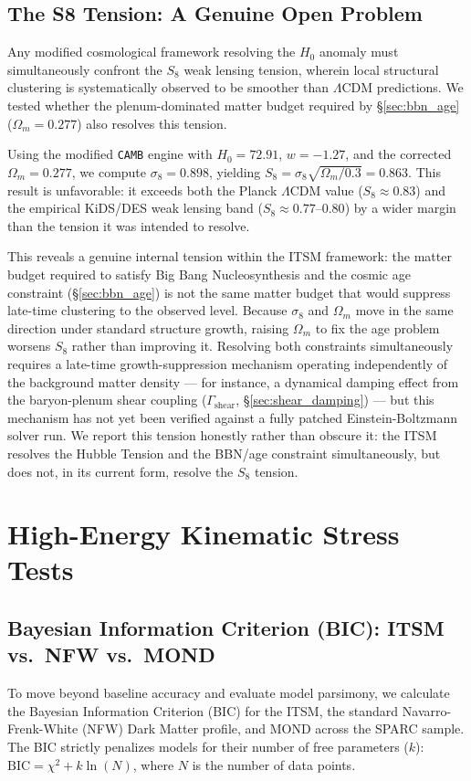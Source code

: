 \documentclass[aps,prd,10pt,twocolumn,superscriptaddress,nofootinbib,floatfix]{revtex4-2}
\begin{document}
\subsection{\label{sec:s8}The S8 Tension: A Genuine Open Problem}
Any modified cosmological framework resolving the $H_0$ anomaly must simultaneously confront the $S_8$ weak lensing tension, wherein local structural clustering is systematically observed to be smoother than $\Lambda$CDM predictions. We tested whether the plenum-dominated matter budget required by \S\ref{sec:bbn_age} ($\Omega_m = 0.277$) also resolves this tension.

Using the modified \texttt{CAMB} engine with $H_0 = 72.91$, $w = -1.27$, and the corrected $\Omega_m = 0.277$, we compute $\sigma_8 = 0.898$, yielding $S_8 = \sigma_8\sqrt{\Omega_m/0.3} = 0.863$. This result is unfavorable: it exceeds both the Planck $\Lambda$CDM value ($S_8 \approx 0.83$) and the empirical KiDS/DES weak lensing band ($S_8 \approx 0.77$--$0.80$) by a wider margin than the tension it was intended to resolve.

This reveals a genuine internal tension within the ITSM framework: the matter budget required to satisfy Big Bang Nucleosynthesis and the cosmic age constraint (\S\ref{sec:bbn_age}) is not the same matter budget that would suppress late-time clustering to the observed level. Because $\sigma_8$ and $\Omega_m$ move in the same direction under standard structure growth, raising $\Omega_m$ to fix the age problem worsens $S_8$ rather than improving it. Resolving both constraints simultaneously requires a late-time growth-suppression mechanism operating independently of the background matter density --- for instance, a dynamical damping effect from the baryon-plenum shear coupling ($\Gamma_{\text{shear}}$, \S\ref{sec:shear_damping}) --- but this mechanism has not yet been verified against a fully patched Einstein-Boltzmann solver run. We report this tension honestly rather than obscure it: the ITSM resolves the Hubble Tension and the BBN/age constraint simultaneously, but does not, in its current form, resolve the $S_8$ tension.

\section{High-Energy Kinematic Stress Tests}

\subsection{\label{sec:bic}Bayesian Information Criterion (BIC): ITSM vs.\ NFW vs.\ MOND}
To move beyond baseline accuracy and evaluate model parsimony, we calculate the Bayesian Information Criterion (BIC) for the ITSM, the standard Navarro-Frenk-White (NFW) Dark Matter profile, and MOND across the SPARC sample. The BIC strictly penalizes models for their number of free parameters ($k$): $\text{BIC} = \chi^2 + k \ln(N)$, where $N$ is the number of data points.
\end{document}
